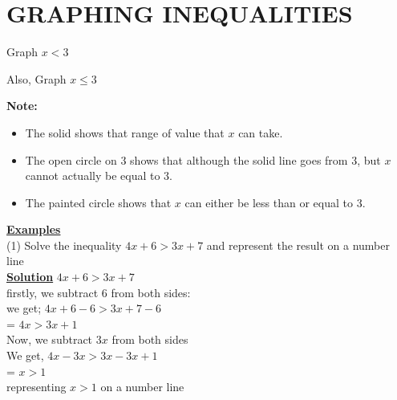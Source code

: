 \documentclass[12pt]{report}
\newcommand{\bt}[1]{\textbf{#1}}
\newcommand{\ubt}[1]{\textbf{\underline{#1}}}
\newcommand{\NI}{\noindent}
\begin{document}
	\section{GRAPHING INEQUALITIES}
	Graph $x<3$
	\begin{center}
	\end{center}
	Also, Graph $x\leq3$
	\begin{center}
	\end{center}
	\bt{Note:}
	\begin{itemize}
		\item The solid shows that range of value that $x$ can take.
		\item The open circle on $3$ shows that although the solid line goes from 3, but $x$ cannot actually be equal to 3.
		\item The painted circle shows that $x$ can either be less than or equal to 3.
	\end{itemize}
	
	\NI\ubt{Examples}\\
	(1) Solve the inequality $4x + 6 > 3x + 7$ and represent the result on a number line\\
	\ubt{Solution}
	$4x + 6 > 3x + 7$\\
	firstly, we subtract 6 from both sides:\\
	we get; \quad $4x + 6-6 > 3x + 7 - 6$\\
	  $\left.\right.$\quad\qquad\quad= $4x > 3x + 1$\\
	Now, we subtract $3x$ from both sides\\
	We get, \quad $4x - 3x > 3x - 3x + 1$\\
	$\left.\right.$\quad\qquad\quad = $x > 1$\\
	representing $x>1$ on a number line\\
	\begin{center}
	\end{center}
\end{document}

